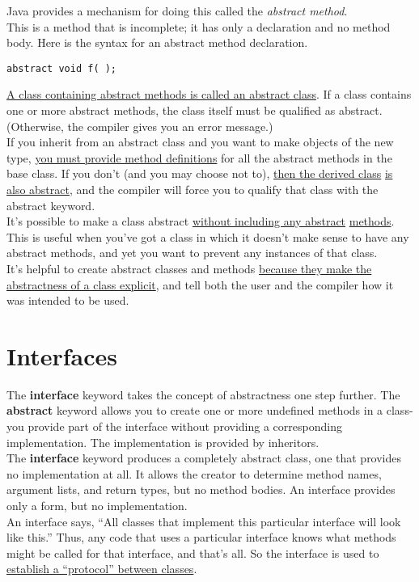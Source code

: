 \documentclass[10pt,letterpaper]{report}
\begin{document}
Java provides a mechanism for doing this called the \textit{abstract method}.\\ This is a method that is incomplete; it has only a declaration and no method body. Here is the syntax for an abstract method declaration.

\begin{lstlisting}
abstract void f( );
\end{lstlisting}
\underline{A class containing abstract methods is called an abstract class}. If a class contains one or more abstract methods, the class itself must be qualified as abstract. (Otherwise, the compiler gives you an error message.)\\

If you inherit from an abstract class and you want to make objects of the new type, \underline{you must provide method definitions} for all the abstract methods in the base class. If you don't (and you may choose not to), \underline{then the derived class} \underline{is also abstract}, and the compiler will force you to qualify that class with the abstract keyword.\\

It's possible to make a class abstract \underline{without including any abstract} \underline{methods}. This is useful when you've got a class in which it doesn't make sense to have any abstract methods, and yet you want to prevent any instances of that class.\\

It's helpful to create abstract classes and methods \underline{because they make the} \underline{abstractness of a class explicit}, and tell both the user and the compiler how it was intended to be used.
\section{Interfaces}
The \textbf{interface} keyword takes the concept of abstractness one step further. The \textbf{abstract} keyword allows you to create one or more undefined methods in a class-you provide part of the interface without providing a corresponding implementation. The implementation is provided by inheritors.\\

The \textbf{interface} keyword produces a completely abstract class, one that provides no implementation at all. It allows the creator to determine method names, argument lists, and return types, but no method bodies. An interface provides only a form, but no implementation.\\
An interface says, ``All classes that implement this particular interface will look like this.'' Thus, any code that uses a particular interface knows what methods might be called for that interface, and that's all. So the interface is used to \underline{establish a ``protocol'' between classes}.\\
\end{document}
